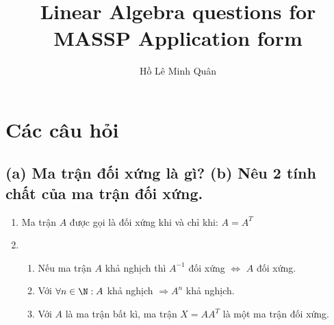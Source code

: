 \documentclass{article}
\title{Linear Algebra questions for MASSP Application form}
\author{Hồ Lê Minh Quân}
\begin{document}
\maketitle




\section{Các câu hỏi}

\subsection{(a) Ma trận đối xứng là gì? (b) Nêu 2 tính chất của ma trận đối xứng.}
\begin{enumerate}[label=(\alph*)]
\item
Ma trận $A$ được gọi là đối xứng khi và chỉ khi: $A = A^T$
\item
    \begin{enumerate}
    \item
    Nếu ma trận $A$ khả nghịch thì $A^{-1}$ đối xứng $\Leftrightarrow$ $A$ đối xứng. \\
    \item
    Với $\forall n \in \N: A$ khả nghịch $\Rightarrow A^n $ khả nghịch. \\
    \item
    Với $A$ là ma trận bất kì, ma trận $X = AA^T$ là một ma trận đối xứng.
    \end{enumerate}
\end{enumerate}
\end{document}
